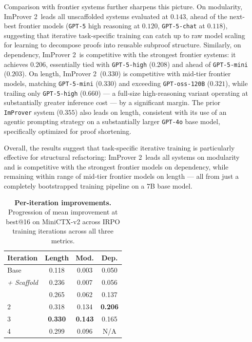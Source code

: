 Comparison with frontier systems further sharpens this picture. On modularity, ImProver 2\ leads all unscaffolded systems evaluated at $0.143$, 
ahead of the next-best frontier models (\texttt{GPT-5} high reasoning at $0.120$, \texttt{GPT-5-chat} at $0.118$), suggesting that iterative task-specific 
training can catch up to raw model scaling for learning to decompose proofs into 
reusable subproof structure.
Similarly, on dependency, ImProver 2\ is competitive with the strongest frontier systems: 
it achieves $0.206$, essentially tied with \texttt{GPT-5-high} ($0.208$) and 
ahead of \texttt{GPT-5-mini} ($0.203$).
On length, ImProver 2\ ($0.330$) is competitive with mid-tier frontier models, 
matching \texttt{GPT-5-mini} ($0.330$) and exceeding \texttt{GPT-oss-120B} 
($0.321$), while trailing only \texttt{GPT-5-high} ($0.660$) — a full-size 
high-reasoning variant operating at substantially greater inference cost — by 
a significant margin. The prior \texttt{ImProver} system ($0.355$) also leads 
on length, consistent with its use of an agentic prompting strategy on a substantially larger \texttt{GPT-4o} base model, specifically optimized for proof shortening.

Overall, the results suggest that task-specific iterative training is particularly 
effective for structural refactoring: ImProver 2\ leads all systems on modularity 
and is competitive with the strongest frontier models on dependency, while 
remaining within range of mid-tier frontier models on length --- all from just a completely bootstrapped training pipeline on a 7B base model.



\begin{table}
\centering
\caption{\textbf{Per-iteration improvements.} Progression of mean improvement at best@16 on MiniCTX-v2 across IRPO training iterations across all three metrics.}
\small
\begin{tabular}{lccc}
\hline
\textbf{Iteration} & \textbf{Length}  & \textbf{Mod.}  & \textbf{Dep.}  \\
\hline
Base     & 0.118 & 0.003 & 0.050  \\ 
\textit{+ Scaffold} & 0.236 & 0.007 & 0.056  \\
\hdashline
1   & 0.265 & 0.062 & 0.137  \\
2   & 0.318  & 0.134 & \textbf{0.206}  \\
3   & \textbf{0.330}  & \textbf{0.143} & 0.165  \\
4   & 0.299 & 0.096 & N/A \\
\hline
\end{tabular}
\label{tab:iter}
\end{table}



